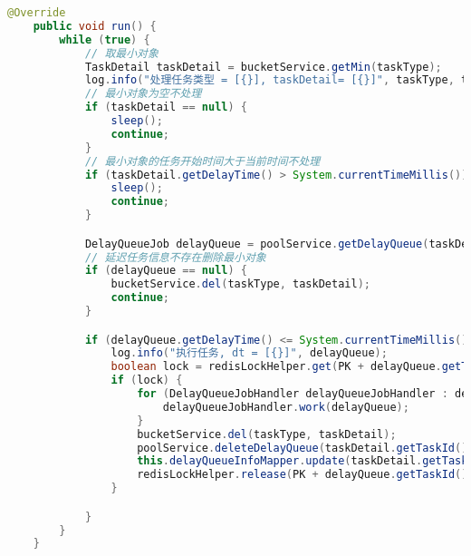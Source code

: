\begin{lstlisting}[language=java,label={单一任务处理流程},caption={单一任务处理流程}]
	@Override
	public void run() {
		while (true) {
			// 取最小对象
			TaskDetail taskDetail = bucketService.getMin(taskType);
			log.info("处理任务类型 = [{}], taskDetail= [{}]", taskType, taskDetail);
			// 最小对象为空不处理
			if (taskDetail == null) {
				sleep();
				continue;
			}
			// 最小对象的任务开始时间大于当前时间不处理
			if (taskDetail.getDelayTime() > System.currentTimeMillis()) {
				sleep();
				continue;
			}

			DelayQueueJob delayQueue = poolService.getDelayQueue(taskDetail.getTaskId());
			// 延迟任务信息不存在删除最小对象
			if (delayQueue == null) {
				bucketService.del(taskType, taskDetail);
				continue;
			}

			if (delayQueue.getDelayTime() <= System.currentTimeMillis()) {
				log.info("执行任务, dt = [{}]", delayQueue);
				boolean lock = redisLockHelper.get(PK + delayQueue.getTaskId(), delayQueue.getTaskId(), 10);
				if (lock) {
					for (DelayQueueJobHandler delayQueueJobHandler : delayQueueJobHandlers) {
						delayQueueJobHandler.work(delayQueue);
					}
					bucketService.del(taskType, taskDetail);
					poolService.deleteDelayQueue(taskDetail.getTaskId());
					this.delayQueueInfoMapper.update(taskDetail.getTaskId());
					redisLockHelper.release(PK + delayQueue.getTaskId(), delayQueue.getTaskId());
				}

			}
		}
	}

\end{lstlisting}